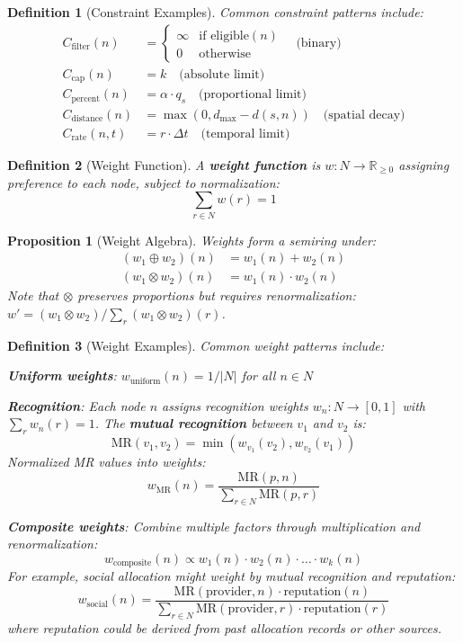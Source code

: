 \documentclass[11pt]{article}
\newtheorem{definition}{Definition}
\newtheorem{proposition}{Proposition}
\begin{document}
\begin{definition}[Constraint Examples]
Common constraint patterns include:
\begin{align}
C_{\text{filter}}(n) &= \begin{cases} \infty & \text{if eligible}(n) \\ 0 & \text{otherwise} \end{cases} \quad \text{(binary)} \\
C_{\text{cap}}(n) &= k \quad \text{(absolute limit)} \\
C_{\text{percent}}(n) &= \alpha \cdot q_s \quad \text{(proportional limit)} \\
C_{\text{distance}}(n) &= \max(0, d_{\max} - d(s, n)) \quad \text{(spatial decay)} \\
C_{\text{rate}}(n, t) &= r \cdot \Delta t \quad \text{(temporal limit)}
\end{align}
\end{definition}

\begin{definition}[Weight Function]
A \textbf{weight function} is $w: N \to \mathbb{R}_{\geq 0}$ assigning preference to each node, subject to normalization:
\[
\sum_{r \in N} w(r) = 1
\]
\end{definition}

\begin{proposition}[Weight Algebra]
Weights form a semiring under:
\begin{align}
(w_1 \oplus w_2)(n) &= w_1(n) + w_2(n) \\
(w_1 \otimes w_2)(n) &= w_1(n) \cdot w_2(n)
\end{align}
Note that $\otimes$ preserves proportions but requires renormalization: $w' = (w_1 \otimes w_2) / \sum_r (w_1 \otimes w_2)(r)$.
\end{proposition}

\begin{definition}[Weight Examples]
Common weight patterns include:

\textbf{Uniform weights}: $w_{\text{uniform}}(n) = 1/|N|$ for all $n \in N$

\textbf{Recognition}: Each node $n$ assigns recognition weights $w_n: N \to [0,1]$ with $\sum_r w_n(r) = 1$. The \textbf{mutual recognition} between $v_1$ and $v_2$ is:
\[
\text{MR}(v_1, v_2) = \min(w_{v_1}(v_2), w_{v_2}(v_1))
\]
Normalized MR values into weights:
\[
w_{\text{MR}}(n) = \frac{\text{MR}(p, n)}{\sum_{r \in N} \text{MR}(p, r)}
\]

\textbf{Composite weights}: Combine multiple factors through multiplication and renormalization:
\[
w_{\text{composite}}(n) \propto w_1(n) \cdot w_2(n) \cdot \ldots \cdot w_k(n)
\]
For example, social allocation might weight by mutual recognition and reputation:
\[
w_{\text{social}}(n) = \frac{\text{MR}(\text{provider}, n) \cdot \text{reputation}(n)}{\sum_{r \in N} \text{MR}(\text{provider}, r) \cdot \text{reputation}(r)}
\]
where reputation could be derived from past allocation records or other sources.
\end{definition}
\end{document}
